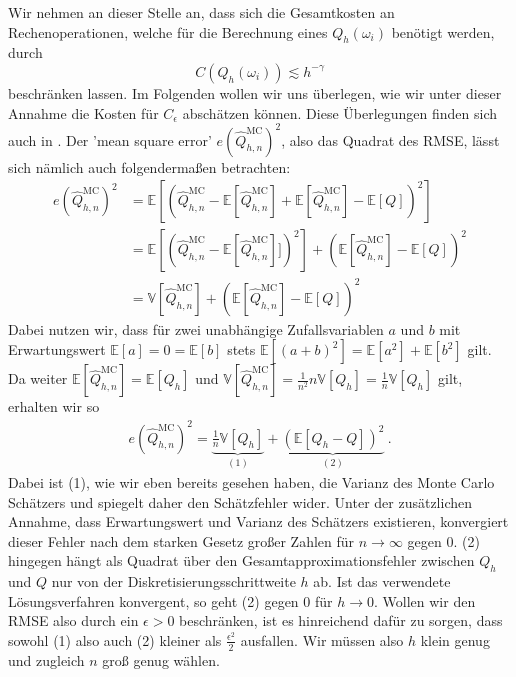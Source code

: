 Wir nehmen an dieser Stelle an, dass sich die Gesamtkosten an Rechenoperationen, welche für die Berechnung eines $ Q_h(\omega_i) $ benötigt werden, durch
 \[
 	C(Q_h(\omega_i))  \lesssim h^{- \gamma}
 \] beschränken lassen.
 Im Folgenden wollen wir uns überlegen, wie wir unter dieser Annahme die Kosten für $ C_{\epsilon} $ abschätzen können. Diese Überlegungen finden sich auch in \cite{cliffe2011multilevel}.
 Der 'mean square error' $ e(\widehat{Q}_{h,n}^{\text{MC}})^2 $, also das Quadrat des RMSE, lässt sich nämlich auch folgendermaßen betrachten:
 \begin{align}
 \label{badumts}
 	e(\widehat{Q}_{h,n}^{\text{MC}})^2 &= \mathbb{E} \left[ \left( \widehat{Q}_{h,n}^{\text{MC}} -  \mathbb{E}[\widehat{Q}_{h,n}^{\text{MC}}] + \mathbb{E}[\widehat{Q}_{h,n}^{\text{MC}}] - \mathbb{E}[Q] \right)^2 \right] \nonumber \\
 	&= \mathbb{E} \left[ ( \widehat{Q}_{h,n}^{\text{MC}} -    \mathbb{E}[\widehat{Q}_{h,n}^{\text{MC}}]])^2 \right] + \left( \mathbb{E}[\widehat{Q}_{h,n}^{\text{MC}}] - \mathbb{E}[Q] \right)^2 \nonumber \\
 	&= \mathbb{V}[\widehat{Q}_{h,n}^{\text{MC}}] + \left( \mathbb{E}[\widehat{Q}_{h,n}^{\text{MC}}] - \mathbb{E}[Q] \right)^2
 \end{align}
 Dabei nutzen wir, dass für zwei unabhängige Zufallsvariablen $ a $ und $ b $ mit Erwartungswert $ \mathbb{E}[a] = 0 = \mathbb{E}[b] $ stets $ \mathbb{E}[(a+b)^2] = \mathbb{E}[a^2]+\mathbb{E}[b^2] $ gilt.
 Da weiter $ \mathbb{E}[\widehat{Q}_{h,n}^{\text{MC}}] = \mathbb{E}[Q_h] $ und $ \mathbb{V}[\widehat{Q}_{h,n}^{\text{MC}}] = \frac{1}{n^2} n \mathbb{V}[Q_h] = \frac{1}{n}  \mathbb{V}[Q_h] $ gilt, erhalten wir so 
 \begin{align}
 \label{mseMC}
	 e(\widehat{Q}_{h,n}^{\text{MC}})^2 = \underbrace{\frac{1}{n}  \mathbb{V}[Q_h]}_{(1)} + \underbrace{(\mathbb{E}[Q_h - Q])^2}_{(2)} \ .
 \end{align}
 Dabei ist (1), wie wir eben bereits gesehen haben, die Varianz des Monte Carlo Schätzers und spiegelt daher den Schätzfehler wider. Unter der zusätzlichen Annahme, dass Erwartungswert und Varianz des Schätzers existieren, konvergiert dieser Fehler nach dem starken Gesetz großer Zahlen für $ n \to \infty $ gegen $ 0 $.
 (2) hingegen hängt als Quadrat über den Gesamtapproximationsfehler zwischen $ Q_h $
 und $ Q $ nur von der Diskretisierungsschrittweite $ h $ ab. Ist das verwendete Lösungsverfahren konvergent, so geht (2) gegen $ 0 $ für $ h \to 0 $.
 Wollen wir den RMSE also durch ein $ \epsilon > 0 $ beschränken, ist es hinreichend dafür zu sorgen, dass sowohl (1) also auch (2) kleiner als $ \frac{\epsilon^2}{2} $ ausfallen. Wir müssen also $ h $ klein genug und zugleich $ n $ groß genug wählen.
